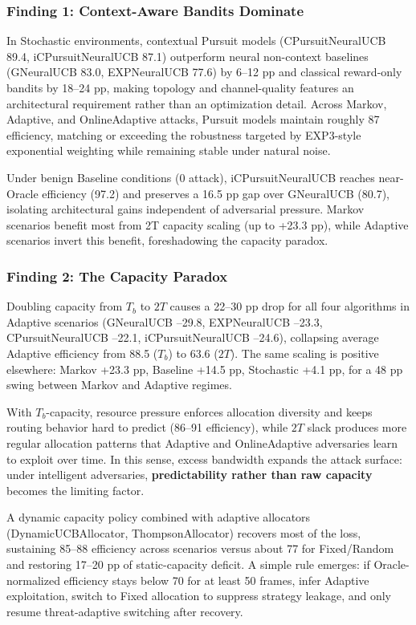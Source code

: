 \documentclass[11pt,a4paper]{article}
\begin{document}
\subsubsection{Finding 1: Context-Aware Bandits Dominate}

In Stochastic environments, contextual Pursuit models (CPursuitNeuralUCB 89.4, iCPursuitNeuralUCB 87.1) outperform neural non-context baselines (GNeuralUCB 83.0, EXPNeuralUCB 77.6) by 6--12 pp and classical reward-only bandits by 18--24 pp, making topology and channel-quality features an architectural requirement rather than an optimization detail. Across Markov, Adaptive, and OnlineAdaptive attacks, Pursuit models maintain roughly 87 efficiency, matching or exceeding the robustness targeted by EXP3-style exponential weighting while remaining stable under natural noise.

Under benign Baseline conditions (0 attack), iCPursuitNeuralUCB reaches near-Oracle efficiency (97.2) and preserves a 16.5 pp gap over GNeuralUCB (80.7), isolating architectural gains independent of adversarial pressure. Markov scenarios benefit most from 2T capacity scaling (up to +23.3 pp), while Adaptive scenarios invert this benefit, foreshadowing the capacity paradox.

\subsubsection{Finding 2: The Capacity Paradox}

Doubling capacity from $T_b$ to $2T$ causes a 22--30 pp drop for all four algorithms in Adaptive scenarios (GNeuralUCB --29.8, EXPNeuralUCB --23.3, CPursuitNeuralUCB --22.1, iCPursuitNeuralUCB --24.6), collapsing average Adaptive efficiency from 88.5 ($T_b$) to 63.6 ($2T$). The same scaling is positive elsewhere: Markov +23.3 pp, Baseline +14.5 pp, Stochastic +4.1 pp, for a 48 pp swing between Markov and Adaptive regimes.

With $T_b$-capacity, resource pressure enforces allocation diversity and keeps routing behavior hard to predict (86--91 efficiency), while $2T$ slack produces more regular allocation patterns that Adaptive and OnlineAdaptive adversaries learn to exploit over time. In this sense, excess bandwidth expands the attack surface: under intelligent adversaries, \textbf{predictability rather than raw capacity} becomes the limiting factor.

A dynamic capacity policy combined with adaptive allocators (DynamicUCBAllocator, ThompsonAllocator) recovers most of the loss, sustaining 85--88 efficiency across scenarios versus about 77 for Fixed/Random and restoring 17--20 pp of static-capacity deficit. A simple rule emerges: if Oracle-normalized efficiency stays below 70 for at least 50 frames, infer Adaptive exploitation, switch to Fixed allocation to suppress strategy leakage, and only resume threat-adaptive switching after recovery.
\end{document}
